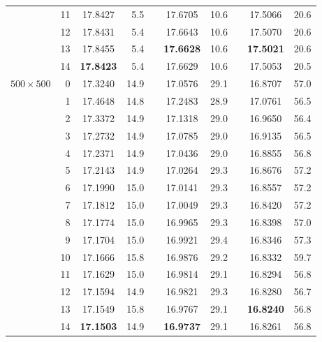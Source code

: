 \begin{table}[p!]
{\begin{tabular}{crcrlcrlcr}
                & 11 &      17.8427  &  5.5 &  &      17.6705  & 10.6 &  &      17.5066  &  20.6 \\
                & 12 &      17.8431  &  5.4 &  &      17.6643  & 10.6 &  &      17.5070  &  20.6 \\
                & 13 &      17.8455  &  5.4 &  & {\bf 17.6628} & 10.6 &  & {\bf 17.5021} &  20.6 \\
                & 14 & {\bf 17.8423} &  5.4 &  &      17.6629  & 10.6 &  &      17.5053  &  20.5 \\
\hline
$500\times 500$ &  0 &      17.3240  & 14.9 &  &      17.0576  & 29.1 &  &      16.8707  &  57.0 \\
                &  1 &      17.4648  & 14.8 &  &      17.2483  & 28.9 &  &      17.0761  &  56.5 \\
                &  2 &      17.3372  & 14.9 &  &      17.1318  & 29.0 &  &      16.9650  &  56.4 \\
                &  3 &      17.2732  & 14.9 &  &      17.0785  & 29.0 &  &      16.9135  &  56.5 \\
                &  4 &      17.2371  & 14.9 &  &      17.0436  & 29.0 &  &      16.8855  &  56.8 \\
                &  5 &      17.2143  & 14.9 &  &      17.0264  & 29.3 &  &      16.8676  &  57.2 \\
                &  6 &      17.1990  & 15.0 &  &      17.0141  & 29.3 &  &      16.8557  &  57.2 \\
                &  7 &      17.1812  & 15.0 &  &      17.0049  & 29.3 &  &      16.8420  &  57.2 \\
                &  8 &      17.1774  & 15.0 &  &      16.9965  & 29.3 &  &      16.8398  &  57.0 \\
                &  9 &      17.1704  & 15.0 &  &      16.9921  & 29.4 &  &      16.8346  &  57.3 \\
                & 10 &      17.1666  & 15.8 &  &      16.9876  & 29.2 &  &      16.8332  &  59.7 \\
                & 11 &      17.1629  & 15.0 &  &      16.9814  & 29.1 &  &      16.8294  &  56.8 \\
                & 12 &      17.1594  & 14.9 &  &      16.9821  & 29.3 &  &      16.8280  &  56.7 \\
                & 13 &      17.1549  & 15.8 &  &      16.9767  & 29.1 &  & {\bf 16.8240} &  56.8 \\
                & 14 & {\bf 17.1503} & 14.9 &  & {\bf 16.9737} & 29.1 &  &      16.8261  &  56.8 \\

\end{tabular}}
\end{table}
